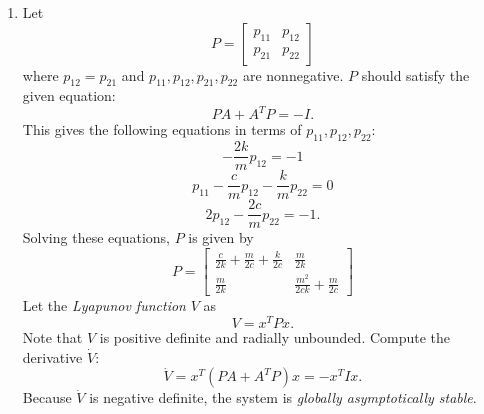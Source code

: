 \documentclass{article}
\begin{document}
\begin{enumerate}
    \item
    Let
    $$ P = 
    \left[
    \begin{matrix}
    p_{11} & p_{12} \\
    p_{21} & p_{22}
    \end{matrix}
    \right]
    $$
    where $p_{12}=p_{21}$ and $p_{11}, p_{12}, p_{21}, p_{22}$ are nonnegative. $P$ should satisfy the given equation:
    $$ PA+A^{T}P=-I. $$
    This gives the following equations in terms of $p_{11}, p_{12}, p_{22}$:
    $$ -\frac{2k}{m}p_{12}=-1 $$
    $$ p_{11}-\frac{c}{m}p_{12}-\frac{k}{m}p_{22}=0 $$
    $$ 2p_{12}-\frac{2c}{m}p_{22}=-1. $$
    Solving these equations, $P$ is given by
    $$ P=
    \left[
    \begin{matrix}
    \frac{c}{2k}+\frac{m}{2c}+\frac{k}{2c} & \frac{m}{2k} \\
    \frac{m}{2k} & \frac{m^2}{2ck}+\frac{m}{2c} 
    \end{matrix}
    \right]
    $$
    Let the \textit{Lyapunov function} $V$ as
    $$ V=x^{T}Px. $$
    Note that $V$ is positive definite and radially unbounded. Compute the derivative $\dot{V}$:
    $$ \dot{V}=x^T(PA+A^{T}P)x=-x^{T}Ix. $$
    Because $\dot{V}$ is negative definite, the system is \textit{globally asymptotically stable}. \\
    
    \end{enumerate}
    
\end{document}
